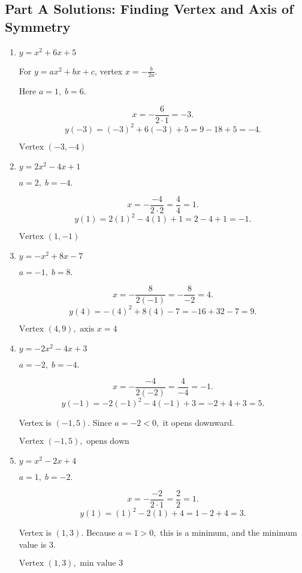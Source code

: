 \documentclass[12pt]{article}
\begin{document}
\subsection*{Part A Solutions: Finding Vertex and Axis of Symmetry}
\begin{enumerate}
  \item \(y = x^2 + 6x + 5\)

  For \(y = ax^2 + bx + c\), vertex \(x = -\frac{b}{2a}.\)

  Here \(a = 1,\; b = 6.\)

  \[
  x = -\frac{6}{2 \cdot 1} = -3.
  \]
  \[
  y(-3) = (-3)^2 + 6(-3) + 5 = 9 - 18 + 5 = -4.
  \]

  \(\boxed{\text{Vertex } (-3, -4)}\)

  \item \(y = 2x^2 - 4x + 1\)

  \(a = 2,\; b = -4.\)

  \[
  x = -\frac{-4}{2 \cdot 2} = \frac{4}{4} = 1.
  \]
  \[
  y(1) = 2(1)^2 - 4(1) + 1 = 2 - 4 + 1 = -1.
  \]

  \(\boxed{\text{Vertex } (1, -1)}\)

  \item \(y = -x^2 + 8x - 7\)

  \(a = -1,\; b = 8.\)

  \[
  x = -\frac{8}{2(-1)} = -\frac{8}{-2} = 4.
  \]
  \[
  y(4) = -(4)^2 + 8(4) - 7 = -16 + 32 - 7 = 9.
  \]

  \(\boxed{\text{Vertex } (4, 9), \text{ axis } x = 4}\)

  \item \(y = -2x^2 - 4x + 3\)

  \(a = -2,\; b = -4.\)

  \[
  x = -\frac{-4}{2(-2)} = \frac{4}{-4} = -1.
  \]
  \[
  y(-1) = -2(-1)^2 - 4(-1) + 3 = -2 + 4 + 3 = 5.
  \]

  Vertex is \((-1, 5)\). Since \(a = -2 < 0,\) it opens downward.

  \(\boxed{\text{Vertex } (-1, 5), \text{ opens down}}\)

  \item \(y = x^2 - 2x + 4\)

  \(a = 1,\; b = -2.\)

  \[
  x = -\frac{-2}{2 \cdot 1} = \frac{2}{2} = 1.
  \]
  \[
  y(1) = (1)^2 - 2(1) + 4 = 1 - 2 + 4 = 3.
  \]

  Vertex is \((1, 3).\) Because \(a = 1 > 0,\) this is a minimum, and the minimum value is 3.

  \(\boxed{\text{Vertex } (1, 3), \text{ min value } 3}\)
\end{enumerate}
\end{document}
